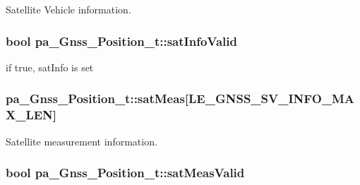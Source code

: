 Satellite Vehicle information. 

\subsubsection[{\texorpdfstring{sat\+Info\+Valid}{satInfoValid}}]{\setlength{\rightskip}{0pt plus 5cm}bool pa\+\_\+\+Gnss\+\_\+\+Position\+\_\+t\+::sat\+Info\+Valid}\hypertarget{structpa___gnss___position__t_a892f296b0ad142ab76f7abcabcf3b478}{}\label{structpa___gnss___position__t_a892f296b0ad142ab76f7abcabcf3b478}


if true, sat\+Info is set 

\subsubsection[{\texorpdfstring{sat\+Meas}{satMeas}}]{ pa\+\_\+\+Gnss\+\_\+\+Position\+\_\+t\+::sat\+Meas\mbox{[}{\bf L\+E\+\_\+\+G\+N\+S\+S\+\_\+\+S\+V\+\_\+\+I\+N\+F\+O\+\_\+\+M\+A\+X\+\_\+\+L\+EN}\mbox{]}}\hypertarget{structpa___gnss___position__t_a06222987fe8539f563063838ec084c25}{}\label{structpa___gnss___position__t_a06222987fe8539f563063838ec084c25}


Satellite measurement information. 

\subsubsection[{\texorpdfstring{sat\+Meas\+Valid}{satMeasValid}}]{\setlength{\rightskip}{0pt plus 5cm}bool pa\+\_\+\+Gnss\+\_\+\+Position\+\_\+t\+::sat\+Meas\+Valid}\hypertarget{structpa___gnss___position__t_a169782222d770cae29bff8fd4d6f8fbb}{}\label{structpa___gnss___position__t_a169782222d770cae29bff8fd4d6f8fbb}


